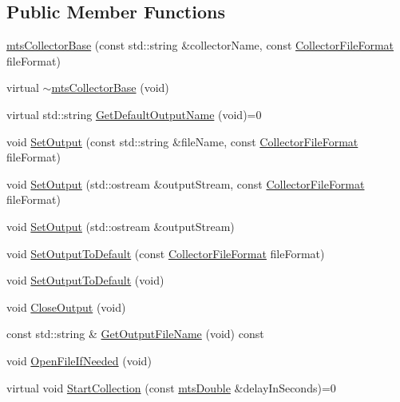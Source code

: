 \subsection*{Public Member Functions}
\begin{DoxyCompactItemize}
\item 
\hyperlink{classmts_collector_base_a60f7407181c031a8e8c57fdd48c4e6c7}{mts\+Collector\+Base} (const std\+::string \&collector\+Name, const \hyperlink{group__cisst_multi_task_gaa228bed8144053d0bfa316f9ac9d0901}{Collector\+File\+Format} file\+Format)
\item 
virtual \hyperlink{classmts_collector_base_a25a5386c1465c3bc95379d427729d0b5}{$\sim$mts\+Collector\+Base} (void)
\item 
virtual std\+::string \hyperlink{classmts_collector_base_a60da1298e1272b6af21a2eb94d4844f0}{Get\+Default\+Output\+Name} (void)=0
\item 
void \hyperlink{classmts_collector_base_a821b7d5be652daf529c461c7d3ba3f4e}{Set\+Output} (const std\+::string \&file\+Name, const \hyperlink{group__cisst_multi_task_gaa228bed8144053d0bfa316f9ac9d0901}{Collector\+File\+Format} file\+Format)
\item 
void \hyperlink{classmts_collector_base_aa3066c51680e52859f05db71a97bf9c1}{Set\+Output} (std\+::ostream \&output\+Stream, const \hyperlink{group__cisst_multi_task_gaa228bed8144053d0bfa316f9ac9d0901}{Collector\+File\+Format} file\+Format)
\item 
void \hyperlink{classmts_collector_base_ada2f3c5a80035350ae0d4c0a1f79d10f}{Set\+Output} (std\+::ostream \&output\+Stream)
\item 
void \hyperlink{classmts_collector_base_a3467807159d338a761a2e7b730a582ce}{Set\+Output\+To\+Default} (const \hyperlink{group__cisst_multi_task_gaa228bed8144053d0bfa316f9ac9d0901}{Collector\+File\+Format} file\+Format)
\item 
void \hyperlink{classmts_collector_base_a6c951b134d74648c86d5b54d04238c50}{Set\+Output\+To\+Default} (void)
\item 
void \hyperlink{classmts_collector_base_aa9ba1bf118223c5cb9d5700a4cf6efaa}{Close\+Output} (void)
\item 
const std\+::string \& \hyperlink{classmts_collector_base_ad28d8ad97ed6592efb1d4a388523773d}{Get\+Output\+File\+Name} (void) const 
\item 
void \hyperlink{classmts_collector_base_a796db0258af6b2297ab530aaf509ba8f}{Open\+File\+If\+Needed} (void)
\item 
virtual void \hyperlink{classmts_collector_base_a2fde70b19fbe88b049e8a8d19320f2c2}{Start\+Collection} (const \hyperlink{mts_generic_object_proxy_8h_a31e76b0190a8d3f9838626cd7b47bd75}{mts\+Double} \&delay\+In\+Seconds)=0

\end{DoxyCompactItemize}
